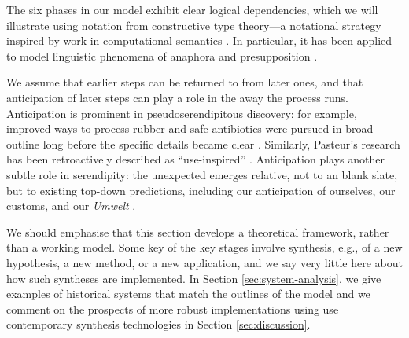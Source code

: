 
The six phases in our model exhibit clear logical dependencies, which
we will illustrate using notation from constructive type theory---a
notational strategy inspired by work in computational semantics
\cite{Chatzikyriakidis2018}.  In particular, it has been applied to
model linguistic phenomena of anaphora and presupposition
\cite{10.1007/978-3-662-43742-1_2,krahmer1999presupposition,piwek2000presuppositions}.

We assume that earlier steps can be returned to from later ones, and
that anticipation of later steps can play a role in the away the
process runs.  Anticipation is prominent in pseudoserendipitous
discovery: for example, improved ways to process rubber and safe
antibiotics were pursued in broad outline long before the specific
details became clear \cite{fleming,goodyear1855gum}.  Similarly,
Pasteur's research has been retroactively described as
``use-inspired'' \cite{stokes1997pasteur}.  Anticipation plays another
subtle role in serendipity: the unexpected emerges relative, not to an
blank slate, but to existing top-down predictions, including our
anticipation of ourselves, our customs, and our \emph{Umwelt}
\cite{dennett_2013}.

We should emphasise that this section develops a theoretical
framework, rather than a working model.  Some key of the key stages
involve synthesis, e.g., of a new hypothesis, a new method, or a new
application, and we say very little here about how such syntheses are
implemented.  In Section \ref{sec:system-analysis}, we give examples
of historical systems that match the outlines of the model and we
comment on the prospects of more robust implementations using use
contemporary synthesis technologies in Section \ref{sec:discussion}.



